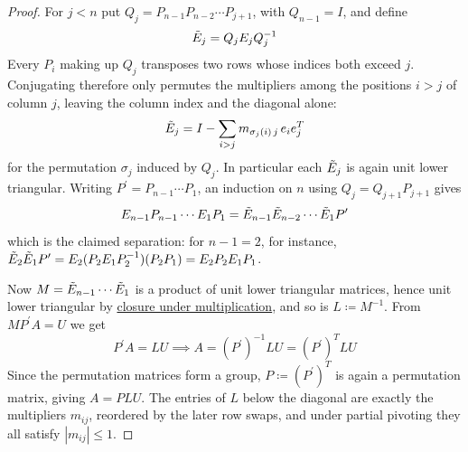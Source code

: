 \begin{proof}
    For $j < n$ put $Q_j = P_{n-1} P_{n-2} \cdots P_{j+1}$, with $Q_{n-1} = I$, and define
    \begin{equation}
      \Tilde{E}_j = Q_j E_j Q_j^{-1}
    \end{equation}
    Every $P_i$ making up $Q_j$ transposes two rows whose indices both exceed $j$. Conjugating therefore only permutes the multipliers among the positions $i > j$ of column $j$, leaving the column index and the diagonal alone:
    \begin{equation}
      \Tilde{E}_j = I - \sum_{i > j} m_{\sigma_j (i) \, j} \, e_i e_j^T
    \end{equation}
    for the permutation $\sigma_j$ induced by $Q_j$. In particular each $\Tilde{E}_j$ is again unit lower triangular. Writing $P^\prime = P_{n-1} \cdots P_1$, an induction on $n$ using $Q_j = Q_{j+1} P_{j+1}$ gives
    \begin{equation}
      E_{n-1} P_{n-1} \cdots E_1 P_1 = \Tilde{E}_{n-1} \Tilde{E}_{n-2} \cdots \Tilde{E}_1 P^\prime
    \end{equation}
    which is the claimed separation: for $n - 1 = 2$, for instance, $\Tilde{E}_2 \Tilde{E}_1 P^\prime = E_2 (P_2 E_1 P_2^{-1})(P_2 P_1) = E_2 P_2 E_1 P_1$.

    Now $M = \Tilde{E}_{n-1} \cdots \Tilde{E}_1$ is a product of unit lower triangular matrices, hence unit lower triangular by \hyperref[thm:triangularity-is-preserved-under-multiplication]{closure under multiplication}, and so is $L \coloneqq M^{-1}$. From $M P^\prime A = U$ we get
    \begin{equation}
      P^\prime A = L U \implies A = (P^\prime)^{-1} L U = (P^\prime)^T L U
    \end{equation}
    Since the permutation matrices form a group, $P \coloneqq (P^\prime)^T$ is again a permutation matrix, giving $A = PLU$. The entries of $L$ below the diagonal are exactly the multipliers $m_{ij}$, reordered by the later row swaps, and under partial pivoting they all satisfy $|m_{ij}| \leq 1$. 
  \end{proof}

